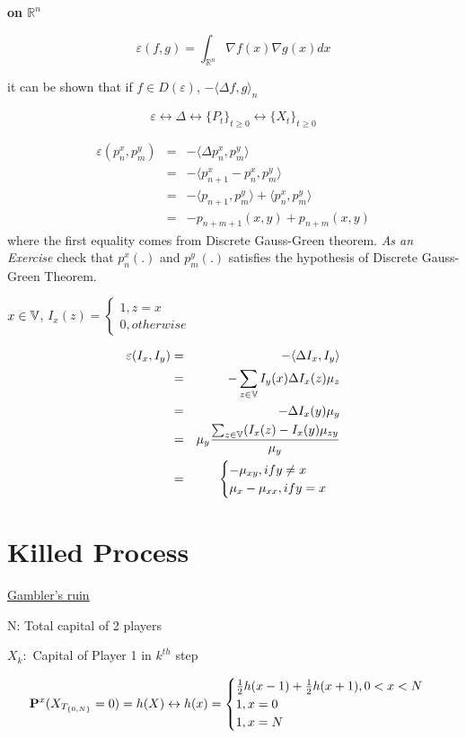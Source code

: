 \documentclass[main]{subfiles}
\begin{document}
\textbf{on $\mathbb{R}^n$}

$$\varepsilon (f,g)= \int_{\mathbb{R}^n} \nabla f(x) \nabla g(x) dx$$

it can be shown that if $f \in D(\varepsilon)$, $-\langle \Delta f, g \rangle_n$

$$\varepsilon \leftrightarrow \Delta \leftrightarrow \{P_t\}_{t \geq 0} \leftrightarrow \{X_t\}_{t \geq 0}$$

\begin{eqnarray*}
    \varepsilon(p_n^x, p_m^y)&=&-\langle  \Delta p_n^x, p_m^y \rangle  \\
    &=& -\langle p_{n+1}^x-p_n^x, p_m^y \rangle \\
    &=& -\langle p_{n+1}, p_m^y \rangle + \langle p_n^x, p_m^y \rangle \\
    &=& -p_{n+m+1}(x,y)+p_{n+m}(x,y)
\end{eqnarray*}
where the first equality comes from Discrete Gauss-Green theorem. \textit{As an Exercise} check that $p_n^x(.)$ and $p_m^y(.)$ satisfies the hypothesis of Discrete Gauss- Green Theorem.

$x \in  \V$,
$I_x(z)=
    \begin{cases}
        1, z=x \\
        0, otherwise
    \end{cases}$

\begin{eqnarray*}
    \varepsilon(I_x, I_y) &=& - \langle \Delta I_x, I_y \rangle \\
    &=& - \sum_{z \in \V} I_y(x)\Delta I_x(z) \mu_z \\
    &=& -\Delta I_x(y) \mu_y \\
    &=& \mu_y \frac{\sum_{z \in \V}(I_x(z)-I_x(y)\mu_{zy}}{\mu_y} \\
    &=&
    \begin{cases}
        -\mu_{xy}, if y \neq x \\
        \mu_x - \mu_{xx}, if y=x
    \end{cases}
\end{eqnarray*}
\section{Killed Process}
\underline{Gambler's ruin}

N: Total capital of 2 players

$X_k:$ Capital of Player 1 in $k^{th}$ step

$$\P^x(X_{T_{\{0,N\}}}=0)=h(X)\leftrightarrow h(x)=
    \begin{cases}
        \frac{1}{2}h(x-1)+\frac{1}{2}h(x+1), 0<x<N \\
        1, x=0                                     \\
        1, x=N
    \end{cases}$$
\end{document}
